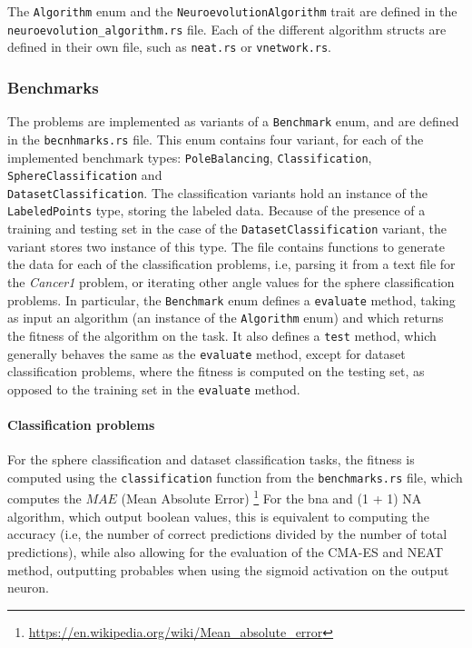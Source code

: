 The \texttt{Algorithm} enum and the \texttt{NeuroevolutionAlgorithm} trait are defined in the \\ \texttt{neuroevolution\_algorithm.rs} file.
Each of the different algorithm structs are defined in their own file, such as \texttt{neat.rs} or \texttt{vnetwork.rs}.

\subsubsection{Benchmarks}

The problems are implemented as variants of a \texttt{Benchmark} enum, and are defined in the \texttt{becnhmarks.rs} file.
This enum contains four variant, for each of the implemented benchmark types: \texttt{PoleBalancing}, \texttt{Classification}, \texttt{SphereClassification}
and \\ \texttt{DatasetClassification}.
The classification variants hold an instance of the \texttt{LabeledPoints} type, storing the labeled data.
Because of the presence of a training and testing set in the case of the \texttt{DatasetClassification} variant, the variant stores two instance of this type.
The file contains functions to generate the
data for each of the classification problems, i.e, parsing it from a text file for the \textit{Cancer1} problem, or iterating other
angle values for the sphere classification problems. In particular, the \texttt{Benchmark} enum defines a \texttt{evaluate} method, taking as input an
algorithm (an instance of the \texttt{Algorithm} enum) and which returns the fitness of the algorithm on the task.
It also defines a \texttt{test} method, which generally behaves the same as the \texttt{evaluate} method, except for dataset classification problems, where
the fitness is computed on the testing set, as opposed to the training set in the \texttt{evaluate} method.

\paragraph{Classification problems} For the sphere classification and dataset classification tasks, the fitness is computed using the \texttt{classification}
function from the \texttt{benchmarks.rs} file, which computes the $MAE$ (Mean Absolute Error) \footnote{\url{https://en.wikipedia.org/wiki/Mean_absolute_error}}
For the bna and (1 + 1) NA algorithm, which output boolean
values, this is equivalent to computing the accuracy (i.e, the number of correct predictions divided by the number of total predictions), while also
allowing for the evaluation of the CMA-ES and NEAT method, outputting probables when using the sigmoid activation on the output neuron.

